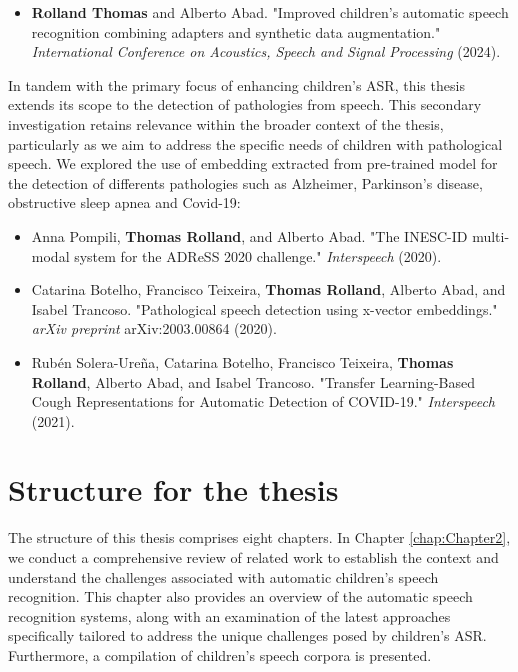 \begin{itemize}
    \item \textbf{Rolland Thomas} and Alberto Abad. "Improved children’s automatic speech recognition combining adapters and synthetic data augmentation." \textit{International Conference on Acoustics, Speech and Signal Processing} (2024).
\end{itemize}

In tandem with the primary focus of enhancing children's \ac{ASR}, this thesis extends its scope to the detection of pathologies from speech. This secondary investigation retains relevance within the broader context of the thesis, particularly as we aim to address the specific needs of children with pathological speech. We explored the use of embedding extracted from pre-trained model for the detection of differents pathologies such as Alzheimer, Parkinson's disease, obstructive sleep apnea and Covid-19:

\begin{itemize}
    \item Anna Pompili, \textbf{Thomas Rolland}, and Alberto Abad. "The INESC-ID multi-modal system for the ADReSS 2020 challenge." \textit{Interspeech} (2020).
    \item Catarina Botelho, Francisco Teixeira, \textbf{Thomas Rolland}, Alberto Abad, and Isabel Trancoso. "Pathological speech detection using x-vector embeddings." \textit{arXiv preprint} arXiv:2003.00864 (2020).
    \item Rubén Solera-Ureña, Catarina Botelho, Francisco Teixeira, \textbf{Thomas Rolland}, Alberto Abad, and Isabel Trancoso. "Transfer Learning-Based Cough Representations for Automatic Detection of COVID-19." \textit{Interspeech} (2021).
\end{itemize}


\section{Structure for the thesis}
The structure of this thesis comprises eight chapters. In Chapter \ref{chap:Chapter2}, we conduct a comprehensive review of related work to establish the context and understand the challenges associated with automatic children's speech recognition. This chapter also provides an overview of the automatic speech recognition systems, along with an examination of the latest approaches specifically tailored to address the unique challenges posed by children's \ac{ASR}. Furthermore, a compilation of children's speech corpora is presented.

